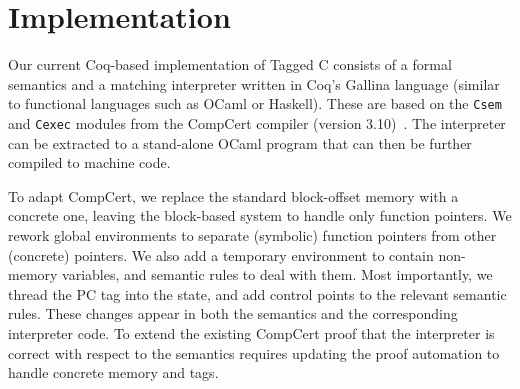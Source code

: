 \documentclass{llncs}
\begin{document}


\section{Implementation}
\label{sec:implementation}

Our current Coq-based implementation of Tagged C consists of a formal semantics and
a matching interpreter written in Coq's Gallina language (similar to functional
languages such as OCaml or Haskell).
These are based on the {\tt Csem} and {\tt Cexec} modules from the CompCert compiler
(version 3.10)~\cite{CompCert3.10}.  The interpreter can be extracted to a stand-alone OCaml program
that can then be further compiled to machine code.

To adapt CompCert, we replace the standard block-offset memory with a concrete one,
leaving the block-based system to handle only function pointers. We rework
global environments to separate (symbolic) function pointers from other (concrete)
pointers. %
We also add a temporary environment to contain non-memory variables,
and semantic rules to deal with them. Most importantly, we thread the PC tag into the state,
and add control points to the relevant semantic rules. These changes appear in both
the semantics and the corresponding interpreter code. 
To extend the existing CompCert proof that the interpreter is correct with respect to the semantics
requires updating the proof automation to handle concrete memory and tags.
\end{document}
